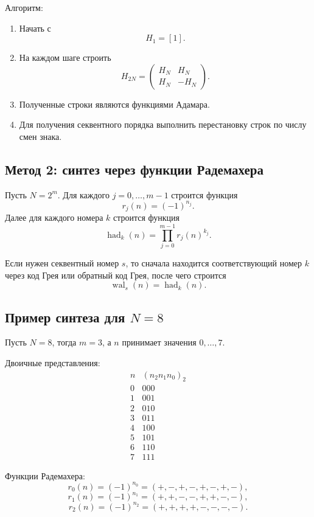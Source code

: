 \documentclass[12pt,a4paper]{article}
\begin{document}
Алгоритм:

\begin{enumerate}
    \item Начать с
    \[
        H_1=[1].
    \]
    \item На каждом шаге строить
    \[
        H_{2N}=
        \begin{pmatrix}
            H_N&H_N\\
            H_N&-H_N
        \end{pmatrix}.
    \]
    \item Полученные строки являются функциями Адамара.
    \item Для получения секвентного порядка выполнить перестановку строк по числу смен знака.
\end{enumerate}

\subsection{Метод 2: синтез через функции Радемахера}

Пусть $N=2^m$. Для каждого $j=0,\ldots,m-1$ строится функция
\[
    r_j(n)=(-1)^{n_j}.
\]
Далее для каждого номера $k$ строится функция
\[
    \operatorname{had}_k(n)=\prod_{j=0}^{m-1}r_j(n)^{k_j}.
\]

Если нужен секвентный номер $s$, то сначала находится соответствующий номер $k$ через код Грея или обратный код Грея, после чего строится
\[
    \operatorname{wal}_s(n)=\operatorname{had}_k(n).
\]

\subsection{Пример синтеза для $N=8$}

Пусть $N=8$, тогда $m=3$, а $n$ принимает значения $0,\ldots,7$.

Двоичные представления:
\[
\begin{array}{c|c}
n & (n_2n_1n_0)_2\\
\hline
0&000\\
1&001\\
2&010\\
3&011\\
4&100\\
5&101\\
6&110\\
7&111
\end{array}
\]

Функции Радемахера:
\[
r_0(n)=(-1)^{n_0}=(+,-,+,-,+,-,+,-),
\]
\[
r_1(n)=(-1)^{n_1}=(+,+,-,-,+,+,-,-),
\]
\[
r_2(n)=(-1)^{n_2}=(+,+,+,+,-,-,-,-).
\]
\end{document}
